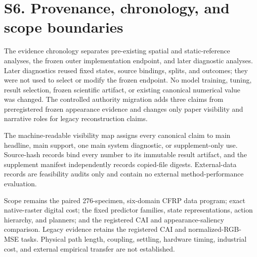 \documentclass[11pt]{article}
\begin{document}
\section{S6. Provenance, chronology, and scope boundaries}

The evidence chronology separates pre-existing spatial and static-reference
analyses, the frozen outer implementation endpoint, and later diagnostic
analyses. Later diagnostics reused fixed states, source bindings, splits, and
outcomes; they were not used to select or modify the frozen endpoint. No model
training, tuning, result selection, frozen scientific artifact, or existing
canonical numerical value was changed. The controlled authority migration adds
three claims from preregistered frozen appearance evidence and changes only
paper visibility and narrative roles for legacy reconstruction claims.

The machine-readable visibility map assigns every canonical claim to main
headline, main support, one main system diagnostic, or supplement-only use.
Source-hash records bind every number to its immutable result artifact, and the
supplement manifest independently records copied-file digests. External-data
records are feasibility audits only and contain no external method-performance
evaluation.

Scope remains the paired 276-specimen, six-domain CFRP data program; exact
native-raster digital cost; the fixed predictor families, state
representations, action hierarchy, and planners; and the registered CAI and
appearance-saliency comparison. Legacy evidence retains the registered CAI and
normalized-RGB-MSE tasks. Physical path length, coupling, settling, hardware
timing, industrial cost, and external empirical transfer are not established.
\end{document}
